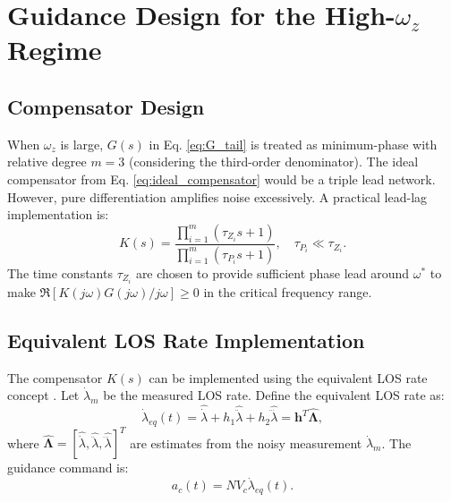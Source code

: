 \documentclass[11pt,a4paper]{article}
\begin{document}
\section{Guidance Design for the High-$\omega_z$ Regime}
\label{sec:design_highwz}

\subsection{Compensator Design}
When $\omega_z$ is large, $G(s)$ in Eq. \eqref{eq:G_tail} is treated as minimum-phase with relative degree $m=3$ (considering the third-order denominator). The ideal compensator from Eq. \eqref{eq:ideal_compensator} would be a triple lead network. However, pure differentiation amplifies noise excessively. A practical lead-lag implementation is:
\begin{equation}
K(s) = \frac{\prod_{i=1}^{m} (\tau_{Z_i} s + 1)}{\prod_{i=1}^{m} (\tau_{P_i} s + 1)}, \quad \tau_{P_i} \ll \tau_{Z_i}.
\label{eq:practical_compensator}
\end{equation}
The time constants $\tau_{Z_i}$ are chosen to provide sufficient phase lead around $\omega^*$ to make $\Re[K(j\omega)G(j\omega)/j\omega] \geq 0$ in the critical frequency range.

\subsection{Equivalent LOS Rate Implementation}
The compensator $K(s)$ can be implemented using the equivalent LOS rate concept \cite{Gurfil_2001_08}. Let $\dot{\lambda}_{m}$ be the measured LOS rate. Define the equivalent LOS rate as:
\begin{equation}
\dot{\lambda}_{eq}(t) = \hat{\dot{\lambda}} + h_1 \hat{\ddot{\lambda}} + h_2 \hat{\dddot{\lambda}} = \mathbf{h}^T \hat{\bm{\Lambda}},
\label{eq:equivalent_los}
\end{equation}
where $\hat{\bm{\Lambda}} = [\hat{\dot{\lambda}}, \hat{\ddot{\lambda}}, \hat{\dddot{\lambda}}]^T$ are estimates from the noisy measurement $\dot{\lambda}_m$. The guidance command is:
\begin{equation}
a_c(t) = N V_c \dot{\lambda}_{eq}(t).
\label{eq:ZMD_cmd}
\end{equation}
\end{document}
